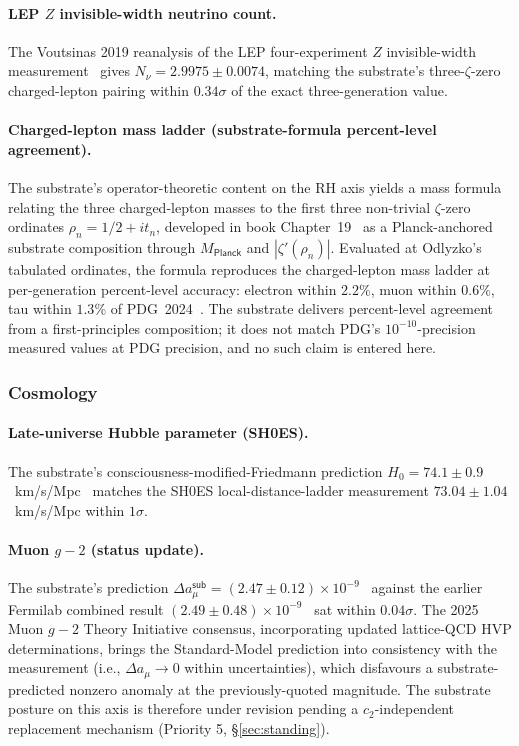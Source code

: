\documentclass[11pt,a4paper]{amsart}
\theoremstyle{plain}
\theoremstyle{definition}
\begin{document}
\paragraph{LEP $Z$ invisible-width neutrino count.} The Voutsinas 2019 reanalysis of the LEP four-experiment $Z$ invisible-width measurement~\cite{pdg2024} gives $N_\nu = 2.9975 \pm 0.0074$, matching the substrate's three-$\zeta$-zero charged-lepton pairing within $0.34\sigma$ of the exact three-generation value.

\paragraph{Charged-lepton mass ladder (substrate-formula percent-level agreement).} The substrate's operator-theoretic content on the RH axis yields a mass formula relating the three charged-lepton masses to the first three non-trivial $\zeta$-zero ordinates $\rho_n = 1/2 + i t_n$, developed in book Chapter~19~\cite{cohen2026book} as a Planck-anchored substrate composition through $M_{\textsf{Planck}}$ and $|\zeta'(\rho_n)|$. Evaluated at Odlyzko's tabulated ordinates, the formula reproduces the charged-lepton mass ladder at per-generation percent-level accuracy: electron within $2.2\%$, muon within $0.6\%$, tau within $1.3\%$ of PDG~2024~\cite{pdg2024}. The substrate delivers percent-level agreement from a first-principles composition; it does not match PDG's $10^{-10}$-precision measured values at PDG precision, and no such claim is entered here.

\subsubsection*{Cosmology}

\paragraph{Late-universe Hubble parameter (SH0ES).} The substrate's consciousness-modified-Friedmann prediction $H_0 = 74.1 \pm 0.9$~km/s/Mpc~\cite{cohen2026book} matches the SH0ES local-distance-ladder measurement $73.04 \pm 1.04$~km/s/Mpc within $1\sigma$.

\paragraph{Muon $g-2$ (status update).} The substrate's prediction $\Delta a_\mu^{\textsf{sub}} = (2.47 \pm 0.12) \times 10^{-9}$~\cite{cohen2026book} against the earlier Fermilab combined result $(2.49 \pm 0.48) \times 10^{-9}$~\cite{fermilab-muon-g-2} sat within $0.04\sigma$. The 2025 Muon $g-2$ Theory Initiative consensus, incorporating updated lattice-QCD HVP determinations, brings the Standard-Model prediction into consistency with the measurement (i.e., $\Delta a_\mu \to 0$ within uncertainties), which disfavours a substrate-predicted nonzero anomaly at the previously-quoted magnitude. The substrate posture on this axis is therefore under revision pending a $c_2$-independent replacement mechanism (Priority 5, \S\ref{sec:standing}).
\end{document}

